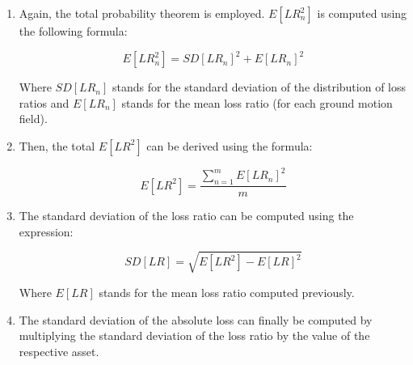 \begin{enumerate}

\item Again, the total probability theorem is employed. $E[LR_n^2]$ is computed using the following formula:

\begin{equation}
E[LR_n^2]=SD[LR_n]^2+E[LR_n]^2
\end{equation}

Where $SD[LR_n]$ stands for the standard deviation of the distribution of loss ratios and $E[LR_n]$ stands for the mean loss ratio (for each ground motion field).

\item Then, the total $E[LR^2]$ can be derived using the formula:

\begin{equation}
E[LR^2]=\frac{\sum_{n=1}^m E[LR_n]^2}{m}
\end{equation}

\item The standard deviation of the loss ratio can be computed using the expression:

\begin{equation}
SD[LR]=\sqrt{E[LR^2]-E[LR]^2}
\end{equation}

Where $E[LR]$ stands for the mean loss ratio computed previously.

\item The standard deviation of the absolute loss can finally be computed by multiplying the standard deviation of the loss ratio by the value of the respective asset.

\end{enumerate}

